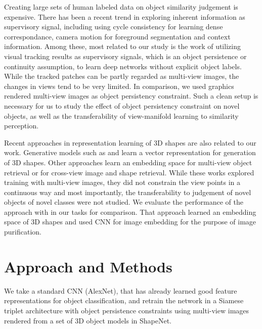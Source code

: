 \documentclass{article} %
\begin{document}
Creating large sets of human labeled data on object similarity judgement is expensive.  There has been a recent trend in exploring inherent information as supervisory signal, including using cycle consistency for learning dense correspondance\citep{zhou2015flowweb}, camera motion for foreground segmentation\citep{zeng2016multi} and context information\citep{doersch2015unsupervised}. Among these,  most related  to our study is the work of \cite{DBLP:journals/corr/WangG15a} utilizing visual tracking results as supervisory signals, which is an object persistence or continuity assumption, to learn deep networks without explicit object labels. While the tracked patches can be partly regarded as multi-view images, the changes in views tend to be very limited. In comparison,  we used graphics rendered multi-view images as object persistency constraint. Such a clean setup is necessary for us to study the effect of object persistency constraint on novel objects, as well as the transferability of view-manifold learning to similarity perception.

Recent approaches in representation learning of 3D shapes are also related to our work. Generative models such as \citep{wu2016learning} and \citep{DBLP:journals/corr/TatarchenkoDB15} learn a vector representation for generation of 3D shapes. Other approaches learn an embedding space for multi-view object retrieval \citep{guo2016multi} or for cross-view image and shape retrieval\citep{li2015jointembedding}. While these works explored training with multi-view images, they did not constrain the view points in a continuous way and most importantly, the transferability to judgement of novel objects of novel classes were  not studied.  We evaluate the performance of  the approach with \cite{li2015jointembedding} in our tasks for comparison. That approach learned an embedding space of 3D shapes and used CNN for image embedding for the purpose of image purification.  %

\section{Approach and Methods}
We take a standard CNN (AlexNet), that has already learned good feature representations for object classification, and retrain the network in a Siamese triplet architecture with object persistence constraints using multi-view images rendered from a set of 3D object models in ShapeNet.
\end{document}
